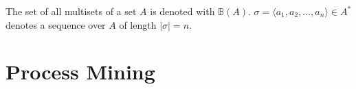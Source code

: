 \begin{comment}
    In the preliminaries you present well-understood mathematical concepts that you need in your thesis.
For example, you can define the natural numbers as $\mathbb{N}{=}\{0,1,2,...\}$, and, correspondingly $\mathbb{N}^+{=}\mathbb{N}{\setminus}\{0\}$.
A preliminary notion is either a well-defined commonly understood mathematical notion, e.g., sets, multisets, graphs, sequences, Petri nets, \dots, or, it is a concept clearly defined in another paper, i.e., you just adopt the notation (or a slight variation thereof).
\emph{Any concept you use should be defined in your thesis}.
You should never write: \enquote{We use Workflow nets, a definition of these can be found here [X]}.
If you use it, explain it.

Concepts that are unique to your approach are not part of the preliminaries, i.e., they are described in the approach section itself.

Some useful tips:
\begin{itemize}
    \item When introducing a complex concept, use the following structure (always works):
    \begin{itemize}
        \item Explain the concept informally.
        \item Provide a formal definition of the concept.
        \item Provide an example, using the formal definition, of the concept.
    \end{itemize}
    In your examples, try to be \emph{as visual as you can}, often, an image says more than 5 pages of text.
    \item use commands, e.g., \texttt{$\backslash$newcommand\{$\backslash$naturals\}\{$\backslash$ensuremath\{$\backslash$mathbb\{N\}\}\}}
\end{itemize}
\end{comment}

\begin{definition}
    The set of all multisets of a set $A$ is denoted with $\mathbb{B}(A)$. $\sigma = \langle a_1, a_2, \dots, a_n \rangle \in A^*$ denotes a sequence over $A$ of length $\lvert \sigma \rvert = n$. 
\end{definition}

\section{Process Mining}



